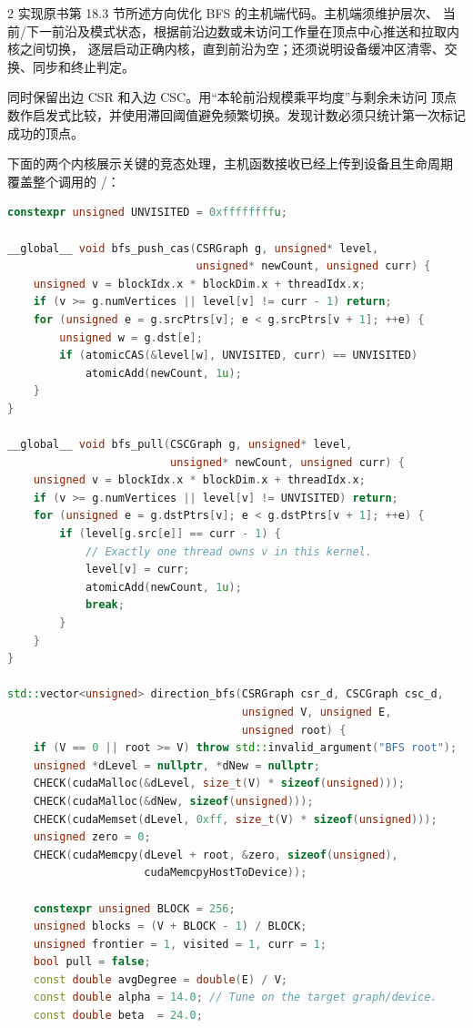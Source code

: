 \begin{solutionexercise}{2}
\problemheading 实现原书第 18.3 节所述方向优化 BFS 的主机端代码。主机端须维护层次、
当前/下一前沿及模式状态，根据前沿边数或未访问工作量在顶点中心推送和拉取内核之间切换，
逐层启动正确内核，直到前沿为空；还须说明设备缓冲区清零、交换、同步和终止判定。

\approachheading 同时保留出边 CSR 和入边 CSC。用“本轮前沿规模乘平均度”与剩余未访问
顶点数作启发式比较，并使用滞回阈值避免频繁切换。发现计数必须只统计第一次标记成功的顶点。

\answerheading 下面的两个内核展示关键的竞态处理，主机函数接收已经上传到设备且生命周期
覆盖整个调用的 /：
\begin{lstlisting}[language=C++]
constexpr unsigned UNVISITED = 0xffffffffu;

__global__ void bfs_push_cas(CSRGraph g, unsigned* level,
                             unsigned* newCount, unsigned curr) {
    unsigned v = blockIdx.x * blockDim.x + threadIdx.x;
    if (v >= g.numVertices || level[v] != curr - 1) return;
    for (unsigned e = g.srcPtrs[v]; e < g.srcPtrs[v + 1]; ++e) {
        unsigned w = g.dst[e];
        if (atomicCAS(&level[w], UNVISITED, curr) == UNVISITED)
            atomicAdd(newCount, 1u);
    }
}

__global__ void bfs_pull(CSCGraph g, unsigned* level,
                         unsigned* newCount, unsigned curr) {
    unsigned v = blockIdx.x * blockDim.x + threadIdx.x;
    if (v >= g.numVertices || level[v] != UNVISITED) return;
    for (unsigned e = g.dstPtrs[v]; e < g.dstPtrs[v + 1]; ++e) {
        if (level[g.src[e]] == curr - 1) {
            // Exactly one thread owns v in this kernel.
            level[v] = curr;
            atomicAdd(newCount, 1u);
            break;
        }
    }
}

std::vector<unsigned> direction_bfs(CSRGraph csr_d, CSCGraph csc_d,
                                    unsigned V, unsigned E,
                                    unsigned root) {
    if (V == 0 || root >= V) throw std::invalid_argument("BFS root");
    unsigned *dLevel = nullptr, *dNew = nullptr;
    CHECK(cudaMalloc(&dLevel, size_t(V) * sizeof(unsigned)));
    CHECK(cudaMalloc(&dNew, sizeof(unsigned)));
    CHECK(cudaMemset(dLevel, 0xff, size_t(V) * sizeof(unsigned)));
    unsigned zero = 0;
    CHECK(cudaMemcpy(dLevel + root, &zero, sizeof(unsigned),
                     cudaMemcpyHostToDevice));

    constexpr unsigned BLOCK = 256;
    unsigned blocks = (V + BLOCK - 1) / BLOCK;
    unsigned frontier = 1, visited = 1, curr = 1;
    bool pull = false;
    const double avgDegree = double(E) / V;
    const double alpha = 14.0; // Tune on the target graph/device.
    const double beta  = 24.0;


\end{lstlisting}
\end{solutionexercise}

